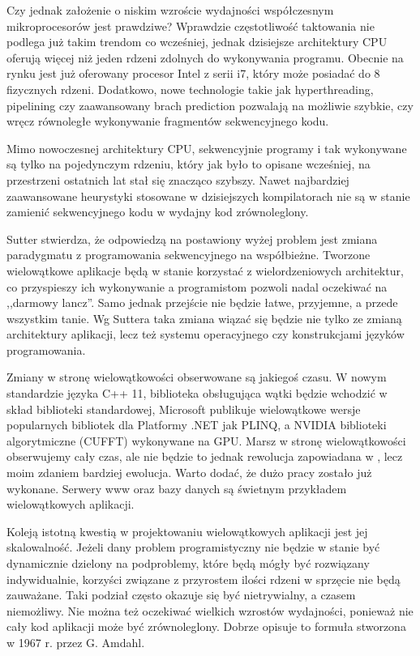 Czy jednak założenie o niskim wzroście wydajności współczesnym mikroprocesorów jest prawdziwe? Wprawdzie częstotliwość taktowania nie podlega już takim trendom co wcześniej, jednak dzisiejsze architektury CPU oferują więcej niż jeden rdzeni zdolnych do wykonywania programu. Obecnie na rynku jest już oferowany procesor Intel z serii i7, który może posiadać do 8 fizycznych rdzeni. Dodatkowo, nowe technologie takie jak hyperthreading, pipelining czy zaawansowany brach prediction pozwalają na możliwie szybkie, czy wręcz równoległe wykonywanie fragmentów sekwencyjnego kodu.

Mimo nowoczesnej architektury CPU, sekwencyjnie programy i tak wykonywane są tylko na pojedynczym rdzeniu\cite{massive}, który jak było to opisane wcześniej, na przestrzeni ostatnich lat stał się znacząco szybszy. Nawet najbardziej zaawansowane heurystyki stosowane w dzisiejszych kompilatorach nie są w stanie zamienić sekwencyjnego kodu w wydajny kod zrównoleglony. 

Sutter stwierdza, że odpowiedzą na postawiony wyżej problem jest zmiana paradygmatu z programowania sekwencyjnego na współbieżne. Tworzone wielowątkowe aplikacje będą w stanie korzystać z wielordzeniowych architektur, co przyspieszy ich wykonywanie a programistom pozwoli nadal oczekiwać na ,,darmowy lancz''. Samo jednak przejście nie będzie łatwe, przyjemne, a przede wszystkim tanie. Wg Suttera taka zmiana wiązać się będzie nie tylko ze zmianą architektury aplikacji, lecz też systemu operacyjnego czy konstrukcjami języków programowania. 

Zmiany w stronę wielowątkowości obserwowane są jakiegoś czasu. W nowym standardzie języka C++ 11, biblioteka obsługująca wątki będzie wchodzić w skład biblioteki standardowej, Microsoft publikuje wielowątkowe wersje popularnych bibliotek dla Platformy .NET jak PLINQ, a NVIDIA biblioteki algorytmiczne (CUFFT) wykonywane na GPU. Marsz w stronę wielowątkowości obserwujemy cały czas, ale nie będzie to jednak rewolucja zapowiadana w \cite{rewolucja}, lecz moim zdaniem bardziej ewolucja. Warto dodać, że dużo pracy zostało już wykonane. Serwery www oraz bazy danych są świetnym przykładem wielowątkowych aplikacji.

Koleją istotną kwestią w projektowaniu wielowątkowych aplikacji jest jej skalowalność. Jeżeli dany problem programistyczny nie będzie w stanie być dynamicznie dzielony na podproblemy, które będą mógły być rozwiązany indywidualnie, korzyści związane z przyrostem ilości rdzeni w sprzęcie nie będą zauważane. Taki podział często okazuje się być nietrywialny, a czasem niemożliwy. Nie można też oczekiwać wielkich wzrostów wydajności, ponieważ nie cały kod aplikacji może być zrównoleglony. Dobrze opisuje to formuła stworzona w 1967 r. przez G. Amdahl.

